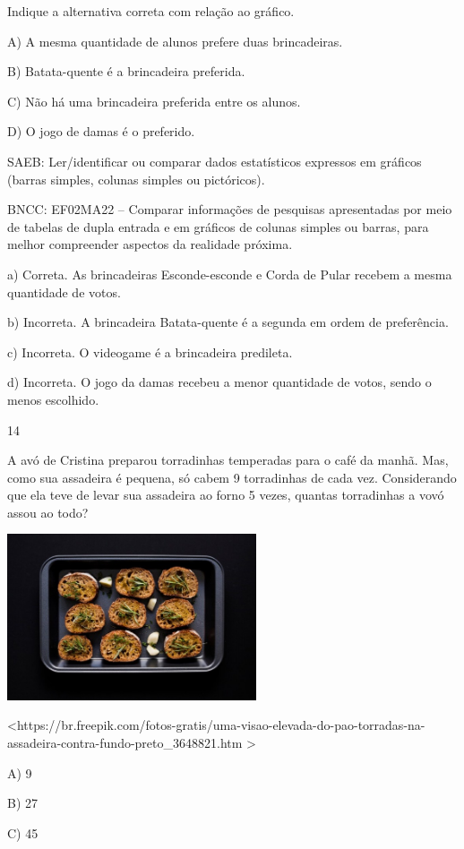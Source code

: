 \begin{escolha}
\begin{escolha}
{{{{{{{{Indique a alternativa correta com relação ao gráfico.

A) A mesma quantidade de alunos prefere duas brincadeiras.

B) Batata-quente é a brincadeira preferida.

C) Não há uma brincadeira preferida entre os alunos.

D) O jogo de damas é o preferido.

SAEB: Ler/identificar ou comparar dados estatísticos expressos
em gráficos (barras simples, colunas simples ou pictóricos).

BNCC: EF02MA22 -- Comparar informações de pesquisas apresentadas por meio
de tabelas de dupla entrada e em gráficos de colunas simples ou barras,
para melhor compreender aspectos da realidade próxima.

a) Correta. As brincadeiras Esconde-esconde e Corda de Pular
recebem a mesma quantidade de votos.

b) Incorreta. A brincadeira Batata-quente é a segunda em ordem de
preferência.

c) Incorreta. O videogame é a brincadeira predileta.

d) Incorreta. O jogo da damas recebeu a menor quantidade de votos,
sendo o menos escolhido.

\num{14}

A avó de Cristina preparou torradinhas temperadas para o café da manhã.
Mas, como sua assadeira é pequena, só cabem 9 torradinhas de cada vez.
Considerando que ela teve de levar sua assadeira ao forno 5 vezes,
quantas torradinhas a vovó assou ao todo?

\includegraphics[width=2.89583in,height=1.93056in]{media/image172.jpeg}

\textless{}https://br.freepik.com/fotos-gratis/uma-visao-elevada-do-pao-torradas-na-assadeira-contra-fundo-preto\_3648821.htm
\textgreater{}

A) 9

B) 27

C) 45

}}}}}}}}
\end{escolha}
\end{escolha}
